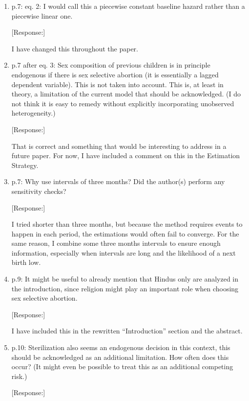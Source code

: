 \documentclass[letterpaper,12pt]{article}
\begin{document}
\begin{enumerate}

\item p.7: eq. 2: I would call this a piecewise constant baseline hazard
rather than a piecewise linear one.

[Response:]

I have changed this throughout the paper.

\item p.7 after eq. 3: Sex composition of previous children is in
principle endogenous  if there is sex selective abortion (it is
essentially a lagged dependent variable). This is not taken into
account. This is, at least in theory, a limitation of the current model
that should be acknowledged. (I do not think it is easy to remedy
without explicitly incorporating unobserved heterogeneity.)

[Response:]

That is correct and something that would be interesting to address in a future paper.
For now, I have included a comment on this in the Estimation Strategy.



\item p.7: Why use intervals of three months? Did the author(s) perform
any sensitivity checks? 

[Response:]

I tried shorter than three months, but because the method requires
events to happen in each period, the estimations would often fail to
converge. For the same reason, I combine some three months intervals to
ensure enough information, especially when intervals are long and the
likelihood of a next birth low.



\item p.9: It might be useful to already mention that Hindus only are
analyzed in the introduction, since religion might play an important
role when choosing sex selective abortion.

[Response:]

I have included this in the rewritten ``Introduction'' section and the abstract.


\item p.10: Sterilization also seems an endogenous decision in this
context, this should be acknowledged as an additional limitation. How
often does this occur? (It might even be possible to treat this as an
additional competing risk.)

[Response:]


\end{enumerate}
\end{document}
